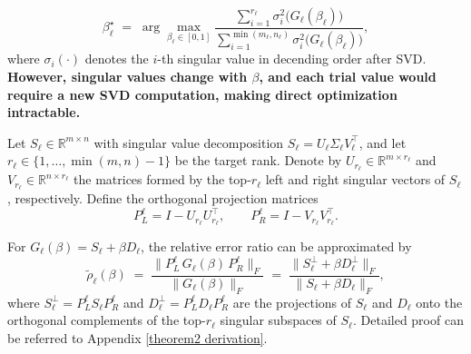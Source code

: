 \begin{equation}
\label{eq:beta obj}
   \beta_\ell^\star 
   \;=\;
   \arg\max_{\beta_\ell \in [0,1]}
   \frac{ \sum_{i=1}^{r_\ell} \sigma_i^2\!\big(G_\ell(\beta_\ell)\big)}
        { \sum_{i=1}^{\min(m_\ell,n_\ell)} \sigma_i^2\!\big(G_\ell(\beta_\ell)\big)},
\end{equation}
where $\sigma_i(\cdot)$ denotes the $i$-th singular value in decending order after SVD. 
\textbf{However, singular values change with $\beta$, and each trial value would require a new SVD computation, making direct optimization intractable.}
\begin{theorem}
\label{theorem2}
Let $S_\ell \in \mathbb{R}^{m \times n}$ with singular value decomposition
$S_\ell = U_\ell \Sigma_\ell V_\ell^\top$, and let $r_\ell \in \{1,\dots,\min(m,n)-1\}$ be the target rank.  
Denote by $U_{r_\ell} \in \mathbb{R}^{m \times r_\ell}$ and $V_{r_\ell} \in \mathbb{R}^{n \times r_\ell}$ 
the matrices formed by the top-$r_\ell$ left and right singular vectors of $S_\ell$, respectively.  
Define the orthogonal projection matrices
\begin{equation}
P_L^\ell = I - U_{r_\ell} U_{r_\ell}^\top, 
\qquad 
P_R^\ell = I - V_{r_\ell} V_{r_\ell}^\top.
\end{equation}

For $G_\ell(\beta) = S_\ell + \beta D_\ell$,
the relative error ratio can be approximated by
\begin{equation}
   \widetilde\rho_\ell(\beta) \;=\; 
   \frac{\|P_L^\ell\,G_\ell(\beta)\,P_R^\ell\|_F}{\|G_\ell(\beta)\|_F}
   \;=\; 
   \frac{\|S_\ell^\perp + \beta D_\ell^\perp\|_F}{\|S_\ell + \beta D_\ell\|_F},
\end{equation}
    where $S_\ell^\perp = P_L^\ell S_\ell P_R^\ell$ and $D_\ell^\perp = P_L^\ell D_\ell P_R^\ell$ are the projections of $S_\ell$ and $D_\ell$ onto the orthogonal complements of the top-$r_\ell$ singular subspaces of $S_\ell$. Detailed proof can be referred to Appendix \ref{theorem2 derivation}.
\end{theorem}

